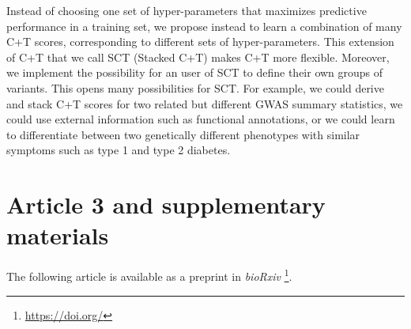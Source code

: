 Instead of choosing one set of hyper-parameters that maximizes predictive performance in a training set, we propose instead to learn a combination of many C+T scores, corresponding to different sets of hyper-parameters.
This extension of C+T that we call SCT (Stacked C+T) makes C+T more flexible.
Moreover, we implement the possibility for an user of SCT to define their own groups of variants. This opens many possibilities for SCT. For example, we could derive and stack C+T scores for two related but different GWAS summary statistics, we could use external information such as functional annotations, or we could learn to differentiate between two genetically different phenotypes with similar symptoms such as type 1 and type 2 diabetes.


\section{Article 3 and supplementary materials}

The following article is available as a preprint in \textit{bioRxiv}	\footnote{\url{https://doi.org/}}.
